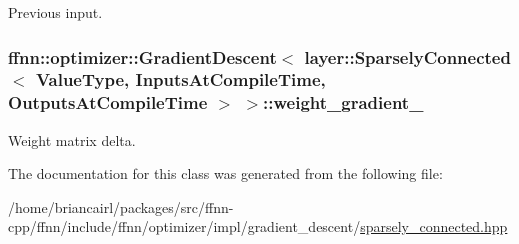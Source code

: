 Previous input. 

\hypertarget{classffnn_1_1optimizer_1_1_gradient_descent_3_01layer_1_1_sparsely_connected_3_01_value_type_00_e6c27913ab0d90f52f73031aa88c19bf_a105f65dc92c783222f228fed80c52fda}{
\subsubsection[{weight\-\_\-gradient\-\_\-}]{ {\bf ffnn\-::optimizer\-::\-Gradient\-Descent}$<$ {\bf layer\-::\-Sparsely\-Connected}$<$ Value\-Type, Inputs\-At\-Compile\-Time, Outputs\-At\-Compile\-Time $>$ $>$\-::weight\-\_\-gradient\-\_\-\hspace{0.3cm}{\ttfamily [protected]}}}\label{classffnn_1_1optimizer_1_1_gradient_descent_3_01layer_1_1_sparsely_connected_3_01_value_type_00_e6c27913ab0d90f52f73031aa88c19bf_a105f65dc92c783222f228fed80c52fda}


Weight matrix delta. 



The documentation for this class was generated from the following file\-:\begin{DoxyCompactItemize}
\item 
/home/briancairl/packages/src/ffnn-\/cpp/ffnn/include/ffnn/optimizer/impl/gradient\-\_\-descent/\hyperlink{optimizer_2impl_2gradient__descent_2sparsely__connected_8hpp}{sparsely\-\_\-connected.\-hpp}\end{DoxyCompactItemize}
